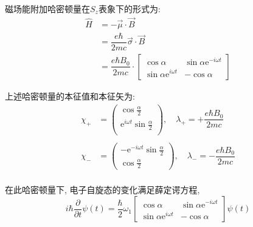 \documentclass[a4paper, 11pt]{article}
\begin{document}
\begin{spacing}{1.2}
        磁场能附加哈密顿量在$S_z$表象下的形式为:
        \begin{equation}
          \begin{aligned}
            \hat{H} &= -\vec\mu\cdot\vec{B}\\
                    &= \dfrac{e\hbar}{2mc}\vec\sigma\cdot\vec{B}\\
                    &= \dfrac{e\hbar{}B_0}{2mc}\cdot
                    \begin{bmatrix}
                      \cos\alpha & \sin\alpha\mathrm{e}^{-i\omega{}t} \\
                      \sin\alpha\mathrm{e}^{i\omega{}t} & -\cos\alpha
                    \end{bmatrix}
          \end{aligned}
        \end{equation}
        
        上述哈密顿量的本征值和本征矢为:
        \begin{equation}
          \begin{aligned}
            \chi_+ &= 
            \left(
              \begin{array}{c}
                \cos\frac{\alpha}{2}\\
                \mathrm{e}^{i\omega{}t}\sin\frac{\alpha}{2}\\
              \end{array} \right),\quad \lambda_+ = +\dfrac{e\hbar{}B_0}{2mc}\\
              \;\\
              \chi_- &= 
              \left(
                \begin{array}{c}
                  -\mathrm{e}^{-i\omega{}t}\sin\frac{\alpha}{2}\\
                  \cos\frac{\alpha}{2}
                \end{array} \right),\quad \lambda_- = -\dfrac{e\hbar{}B_0}{2mc}\\
          \end{aligned}
        \end{equation}

        在此哈密顿量下, 电子自旋态的变化满足薛定谔方程, 
        \begin{equation}
          i\hbar{}\dfrac{\partial}{\partial{}t}\psi(t) = 
          \dfrac{\hbar}{2}\omega_1
          \begin{bmatrix}
            \cos\alpha & \sin\alpha\mathrm{e}^{-i\omega{}t} \\
            \sin\alpha\mathrm{e}^{i\omega{}t} & -\cos\alpha
          \end{bmatrix}
          \psi(t)
        \end{equation}


\end{spacing}
\end{document}
